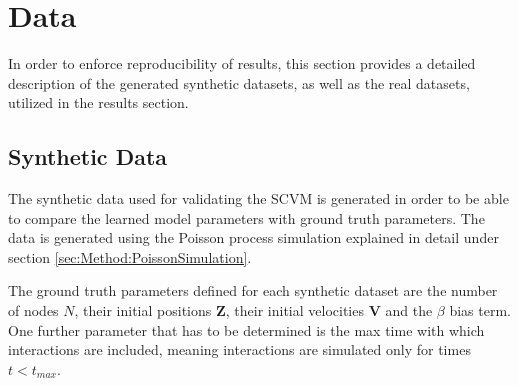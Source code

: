 \section{Data}
\label{sec:Data}
In order to enforce reproducibility of results, this section provides a detailed description of the generated synthetic datasets, as well as the real datasets, utilized in the results section.


\subsection{Synthetic Data}
\label{sec:Data:SyntheticData}
The synthetic data used for validating the SCVM is generated in order to be able to compare the learned model parameters with ground truth parameters.
The data is generated using the Poisson process simulation explained in detail under section \ref{sec:Method:PoissonSimulation}.

The ground truth parameters defined for each synthetic dataset are the number of nodes $N$, their initial positions $\textbf{Z}$, their initial velocities $\textbf{V}$ and the $\beta$ bias term.
One further parameter that has to be determined is the max time with which interactions are included, meaning interactions are simulated only for times $t < t_{max}$.


